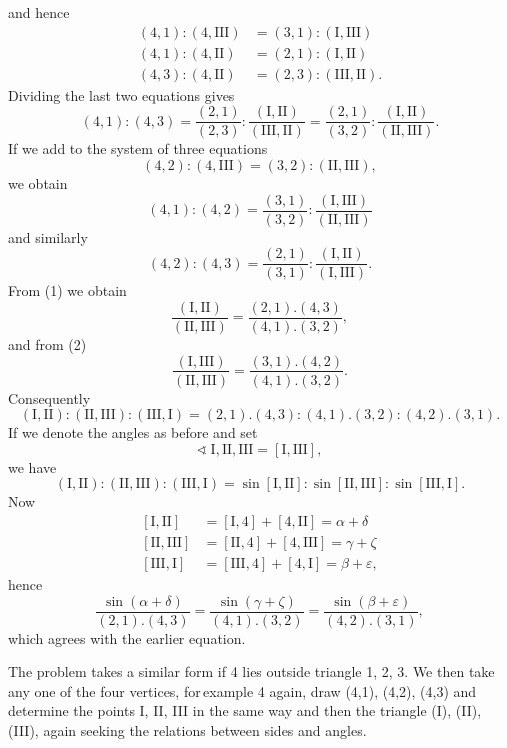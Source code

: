 and hence
\[
\begin{array}{rl}
(4,1) : (4,\text{III}) & = (3,1) : (\text{I}, \text{III}) \\
(4,1) : (4,\text{II}) & = (2,1) : (\text{I}, \text{II}) \\
(4,3) : (4,\text{II}) & = (2,3) : (\text{III}, \text{II}).
\end{array}
\]
Dividing the last two equations gives
\begin{equation}
(4,1) : (4,3) = \frac{(2,1)}{(2,3)} : \frac{(\text{I}, \text{II})}{(\text{III}, \text{II})}
= \frac{(2,1)}{(3,2)} : \frac{(\text{I}, \text{II})}{(\text{II}, \text{III})}.
\tag{1}
\end{equation}
If we add to the system of three equations
\[
(4,2) : (4,\text{III}) = (3,2) : (\text{II}, \text{III}),
\]
we obtain
\begin{equation}
(4,1) : (4,2) = \frac{(3,1)}{(3,2)} : \frac{(\text{I}, \text{III})}{(\text{II}, \text{III})}
\tag{2}
\end{equation}
and similarly
\begin{equation}
(4,2) : (4,3) = \frac{(2,1)}{(3,1)} : \frac{(\text{I}, \text{II})}{(\text{I}, \text{III})}.
\tag{3}
\end{equation}
From (1) we obtain
\[
\frac{(\text{I}, \text{II})}{(\text{II}, \text{III})} = \frac{(2,1) . (4,3)}{(4,1) . (3,2)},
\]
and from (2)
\[
\frac{(\text{I}, \text{III})}{(\text{II}, \text{III})} = \frac{(3,1) . (4,2)}{(4,1) . (3,2)}.
\]
Consequently
\[
(\text{I}, \text{II}) : (\text{II}, \text{III}) : (\text{III}, \text{I}) = (2,1) . (4,3) :
(4,1) . (3,2) : (4,2) . (3,1).
\]
If we denote the angles as before and set
\[
\sphericalangle\ \text{I}, \text{II}, \text{III} = [\text{I}, \text{III}],
\]
we have
\[
(\text{I}, \text{II}) : (\text{II}, \text{III}) : (\text{III}, \text{I}) = \sin[\text{I}, \text{II}] :
\sin[\text{II}, \text{III}] : \sin[\text{III}, \text{I}].
\]
Now
\[
\begin{array}{rl}
{[\text{I}, \text{II}]} & = [\text{I}, 4] + [4, \text{II}] = \alpha + \delta \\
{[\text{II}, \text{III}]} & = [\text{II}, 4] + [4, \text{III}] = \gamma + \zeta \\
{[\text{III}, \text{I}]} & = [\text{III}, 4] + [4, \text{I}] = \beta + \varepsilon,
\end{array}
\]
hence
\[
\frac{\sin(\alpha+\delta)}{(2,1) . (4,3)} = \frac{\sin(\gamma+\zeta)}{(4,1) . (3,2)} =
\frac{\sin(\beta+\varepsilon)}{(4,2) . (3,1)},
\]
which agrees with the earlier equation.

The problem takes a similar form if 4 lies outside triangle 1, 2, 3. We then take any
one of the four vertices, for\,example 4 again, draw (4,1), (4,2), (4,3) and determine the points
I, II, III in the same way and then the triangle (I), (II), (III), again seeking the relations between
sides and angles.
